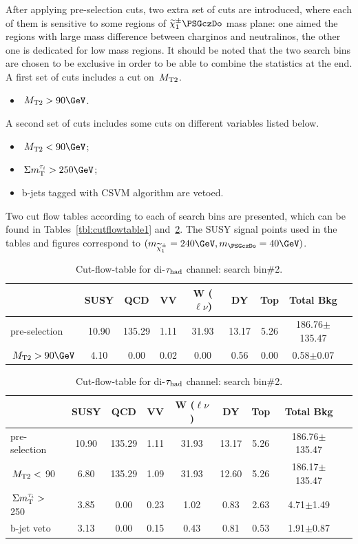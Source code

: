 After applying pre-selection cuts, two extra set of cuts are introduced, where each of them is sensitive to some regions of $\chione\PSGczDo$ mass plane: one aimed the regions with large mass difference between charginos and neutralinos, the other one is dedicated for low mass regions. It should be noted that the two search bins are chosen to be exclusive in order to be able to combine the statistics at the end.
A first set of cuts includes a cut on $\,{M_{\rm T2}}$.
\begin{itemize}
\item $\mttwo>90\GeV$.
\end{itemize}
A second set of cuts includes some cuts on different variables listed below.
\begin{itemize}
\item $\mttwo<90\GeV$;
\item $\SumMT>250\GeV$;
\item b-jets tagged with CSVM algorithm are vetoed.
\end{itemize}
Two cut flow tables according to each of search bins are presented, which can be found in Tables~\ref{tbl:cutflowtable1} and~\ref{tbl:cutflowtable2}. The SUSY signal points used in the tables and figures correspond to $(m_{\chione}=240\GeV,m_{\PSGczDo}=40\GeV)$.   
\begin{table}
\begin{center}
\begin{tabular}{lcccccccc}
\hline\hline
  &SUSY&QCD&VV&W ($\ell\nu$)&DY&Top&Total Bkg&\\
\hline\hline
pre-selection &10.90&135.29&1.11&31.93&13.17&5.26&186.76$\pm$135.47&\\
$\mttwo>90\GeV$&4.10&0.00&0.02&0.00&0.56&0.00&0.58$\pm$0.07&\\
\hline\hline
\end{tabular}
\caption{Cut-flow-table for di-$\tau_{\rm had}$ channel: search bin\#1.}
\label{tbl:cutflowtable1}
\begin{tabular}{lcccccccc}
\hline\hline
  &SUSY&QCD&VV&W ($\ell\nu$)&DY&Top&Total Bkg&\\
\hline\hline
pre-selection &10.90&135.29&1.11&31.93&13.17&5.26&186.76$\pm$135.47&\\
$\,{M_{\rm T2}} < $ 90 &6.80&135.29&1.09&31.93&12.60&5.26&186.17$\pm$135.47&\\
$\,\Sigma m_{\rm T}^{\tau_i} > $ 250 &3.85&0.00&0.23&1.02&0.83&2.63&4.71$\pm$1.49&\\
b-jet veto &3.13&0.00&0.15&0.43&0.81&0.53&1.91$\pm$0.87&\\
\hline\hline
\end{tabular}
\caption{Cut-flow-table for di-$\tau_{\rm had}$ channel: search bin\#2.}
\label{tbl:cutflowtable2}
\end{center}
\end{table}
